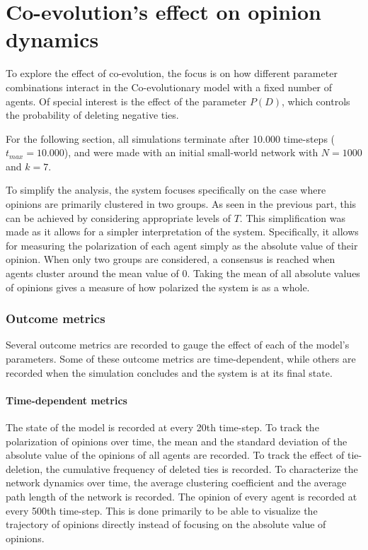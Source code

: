 \documentclass[11pt]{article}
\begin{document}
\part{Co-evolution's effect on opinion dynamics}

To explore the effect of co-evolution, the focus is on how different parameter combinations interact in the Co-evolutionary model with a fixed number of agents. Of special interest is the effect of the parameter $P(D)$, which controls the probability of deleting negative ties. 

\noindent For the following section, all simulations terminate after 10.000 time-steps ($t_{max} = 10.000$), and were made with an initial small-world network with $N=1000$ and $k=7$. 

\noindent To simplify the analysis, the system focuses specifically on the case where opinions are primarily clustered in two groups. As seen in the previous part, this can be achieved by considering appropriate levels of $T$. This simplification was made as it allows for a simpler interpretation of the system. Specifically, it allows for measuring the polarization of each agent simply as the absolute value of their opinion. When only two groups are considered, a consensus is reached when agents cluster around the mean value of 0. Taking the mean of all absolute values of opinions gives a measure of how polarized the system is as a whole. 

\section{Outcome metrics} 
Several outcome metrics are recorded to gauge the effect of each of the model's parameters. Some of these outcome metrics are time-dependent, while others are recorded when the simulation concludes and the system is at its final state. 

\subsection{Time-dependent metrics}
The state of the model is recorded at every 20th time-step.
To track the polarization of opinions over time, the mean and the standard deviation of the absolute value of the opinions of all agents are recorded.
To track the effect of tie-deletion, the cumulative frequency of deleted ties is recorded.
To characterize the network dynamics over time, the average clustering coefficient and the average path length of the network is recorded.
The opinion of every agent is recorded at every 500th time-step. This is done primarily to be able to visualize the trajectory of opinions directly instead of focusing on the absolute value of opinions. 
\end{document}
